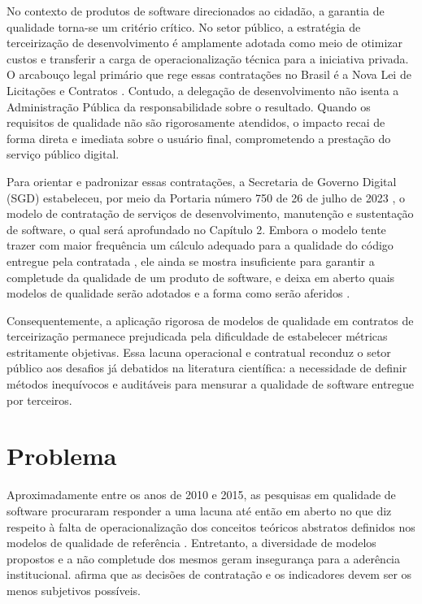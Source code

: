 No contexto de produtos de software direcionados ao cidadão, a garantia de qualidade torna-se um critério crítico. No setor público, a estratégia de terceirização de desenvolvimento é amplamente adotada como meio de otimizar custos e transferir a carga de operacionalização técnica para a iniciativa privada. O arcabouço legal primário que rege essas contratações no Brasil é a Nova Lei de Licitações e Contratos \cite{brasil2021lei}. Contudo, a delegação de desenvolvimento não isenta a Administração Pública da responsabilidade sobre o resultado. Quando os requisitos de qualidade não são rigorosamente atendidos, o impacto recai de forma direta e imediata sobre o usuário final, comprometendo a prestação do serviço público digital.

Para orientar e padronizar essas contratações, a Secretaria de Governo Digital (SGD) estabeleceu, por meio da Portaria número 750 de 26 de julho de 2023 \cite{brasil2023portaria750}, o modelo de contratação de serviços de desenvolvimento, manutenção e sustentação de software, o qual será aprofundado no Capítulo 2. Embora o modelo tente trazer com maior frequência um cálculo adequado para a qualidade do código entregue pela contratada \cite[cap. 12]{brasil2023portaria750}, ele ainda se mostra insuficiente para garantir a completude da qualidade de um produto de software, e deixa em aberto quais modelos de qualidade serão adotados e a forma como serão aferidos \cite[cap. 2]{brasil2023portaria750}.

Consequentemente, a aplicação rigorosa de modelos de qualidade em contratos de terceirização permanece prejudicada pela dificuldade de estabelecer métricas estritamente objetivas. Essa lacuna operacional e contratual reconduz o setor público aos desafios já debatidos na literatura científica: a necessidade de definir métodos inequívocos e auditáveis para mensurar a qualidade de software entregue por terceiros.


\section{Problema}

Aproximadamente entre os anos de 2010 e 2015, as pesquisas em qualidade de software procuraram responder a uma lacuna até então em aberto no que diz respeito à falta de operacionalização dos conceitos teóricos abstratos definidos nos modelos de qualidade de referência \cite{wagner2012quamoco}. Entretanto, a diversidade de modelos propostos e a não completude dos mesmos geram insegurança para a aderência institucional.  afirma que as decisões de contratação e os indicadores devem ser os menos subjetivos possíveis.

